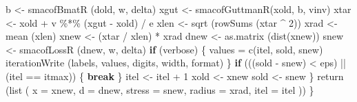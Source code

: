 \documentclass[
  12pt,
  letterpaper,
  DIV=11,
  numbers=noendperiod]{scrreprt}
\newenvironment{Shaded}{\begin{snugshade}}{\end{snugshade}}
\newcommand{\AttributeTok}[1]{\textcolor[rgb]{0.40,0.45,0.13}{#1}}
\newcommand{\ControlFlowTok}[1]{\textcolor[rgb]{0.00,0.23,0.31}{\textbf{#1}}}
\newcommand{\DecValTok}[1]{\textcolor[rgb]{0.68,0.00,0.00}{#1}}
\newcommand{\FunctionTok}[1]{\textcolor[rgb]{0.28,0.35,0.67}{#1}}
\newcommand{\NormalTok}[1]{\textcolor[rgb]{0.00,0.23,0.31}{#1}}
\newcommand{\OtherTok}[1]{\textcolor[rgb]{0.00,0.23,0.31}{#1}}
\newcommand{\SpecialCharTok}[1]{\textcolor[rgb]{0.37,0.37,0.37}{#1}}
\theoremstyle{remark}
\begin{document}
\begin{Shaded}
\begin{Highlighting}[]
\NormalTok{      b }\OtherTok{\textless{}{-}} \FunctionTok{smacofBmatR}\NormalTok{ (dold, w, delta)}
\NormalTok{      xgut }\OtherTok{\textless{}{-}} \FunctionTok{smacofGuttmanR}\NormalTok{(xold, b, vinv)}
\NormalTok{      xtar }\OtherTok{\textless{}{-}}\NormalTok{ xold }\SpecialCharTok{+}\NormalTok{ v }\SpecialCharTok{\%*\%}\NormalTok{ (xgut }\SpecialCharTok{{-}}\NormalTok{ xold) }\SpecialCharTok{/}\NormalTok{ e}
\NormalTok{      xlen }\OtherTok{\textless{}{-}} \FunctionTok{sqrt}\NormalTok{ (}\FunctionTok{rowSums}\NormalTok{ (xtar }\SpecialCharTok{\^{}} \DecValTok{2}\NormalTok{))}
\NormalTok{      xrad }\OtherTok{\textless{}{-}} \FunctionTok{mean}\NormalTok{ (xlen)}
\NormalTok{      xnew }\OtherTok{\textless{}{-}}\NormalTok{ (xtar }\SpecialCharTok{/}\NormalTok{ xlen) }\SpecialCharTok{*}\NormalTok{ xrad}
\NormalTok{      dnew }\OtherTok{\textless{}{-}} \FunctionTok{as.matrix}\NormalTok{ (}\FunctionTok{dist}\NormalTok{(xnew))}
\NormalTok{      snew }\OtherTok{\textless{}{-}} \FunctionTok{smacofLossR}\NormalTok{ (dnew, w, delta)}
        \ControlFlowTok{if}\NormalTok{ (verbose) \{}
\NormalTok{          values }\OtherTok{=} \FunctionTok{c}\NormalTok{(itel, sold, snew)}
          \FunctionTok{iterationWrite}\NormalTok{ (labels, values, digits, width, format)}
\NormalTok{        \}}
        \ControlFlowTok{if}\NormalTok{ (((sold }\SpecialCharTok{{-}}\NormalTok{ snew) }\SpecialCharTok{\textless{}}\NormalTok{ eps) }\SpecialCharTok{||}\NormalTok{ (itel }\SpecialCharTok{==}\NormalTok{ itmax)) \{}
          \ControlFlowTok{break}
\NormalTok{        \}}
\NormalTok{        itel }\OtherTok{\textless{}{-}}\NormalTok{ itel }\SpecialCharTok{+} \DecValTok{1}
\NormalTok{        xold }\OtherTok{\textless{}{-}}\NormalTok{ xnew}
\NormalTok{        sold }\OtherTok{\textless{}{-}}\NormalTok{ snew}
\NormalTok{      \}}
      \FunctionTok{return}\NormalTok{ (}\FunctionTok{list}\NormalTok{ (}
        \AttributeTok{x =}\NormalTok{ xnew,}
        \AttributeTok{d =}\NormalTok{ dnew,}
        \AttributeTok{stress =}\NormalTok{ snew,}
        \AttributeTok{radius =}\NormalTok{ xrad,}
        \AttributeTok{itel =}\NormalTok{ itel}
\NormalTok{      ))}
\NormalTok{  \}}



\end{Highlighting}
\end{Shaded}
\end{document}
